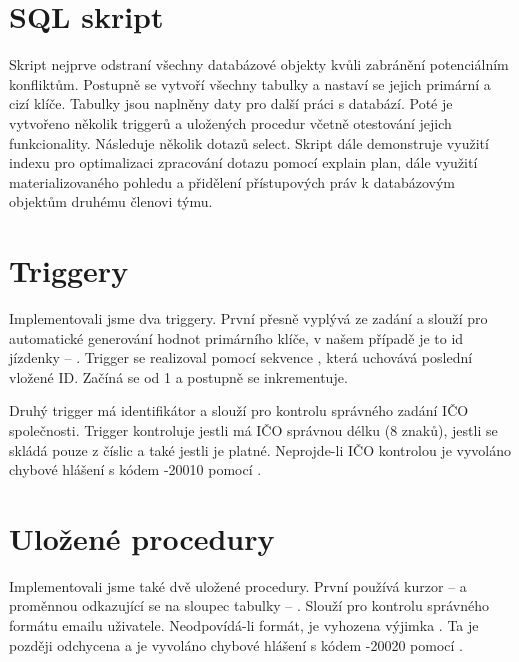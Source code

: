 \documentclass[12pt, a4paper, titlepage]{article}
\begin{document}
{\clearpage


\section{SQL skript}

Skript nejprve odstraní všechny databázové objekty kvůli zabránění potenciálním konfliktům. Postupně se vytvoří všechny tabulky a nastaví se jejich primární a cizí klíče. Tabulky jsou naplněny daty pro další práci s databází. Poté je vytvořeno několik triggerů a uložených procedur včetně otestování jejich funkcionality. Následuje několik dotazů select. Skript dále demonstruje využití indexu pro optimalizaci zpracování dotazu pomocí explain plan, dále využití materializovaného pohledu a přidělení přístupových práv k databázovým objektům druhému členovi týmu.
\medskip


\section{Triggery}

Implementovali jsme dva triggery. První přesně vyplývá ze zadání a slouží pro automatické generování hodnot primárního klíče, v našem případě je to id jízdenky -- . Trigger se realizoval pomocí sekvence , která uchovává poslední vložené ID. Začíná se od 1 a postupně se inkrementuje.
\bigskip

Druhý trigger má identifikátor  a slouží pro kontrolu správného zadání IČO společnosti. Trigger kontroluje jestli má IČO správnou délku (8 znaků), jestli se skládá pouze z číslic a také jestli je platné. Neprojde-li IČO kontrolou je vyvoláno chybové hlášení s kódem -20010 pomocí .
\medskip


\section{Uložené procedury}

Implementovali jsme také dvě uložené procedury. První  používá kurzor --  a proměnnou odkazující se na sloupec tabulky -- . Slouží pro kontrolu správného formátu emailu uživatele. Neodpovídá-li formát, je vyhozena výjimka . Ta je později odchycena a je vyvoláno chybové hlášení s kódem -20020 pomocí .
\bigskip

}
\end{document}
